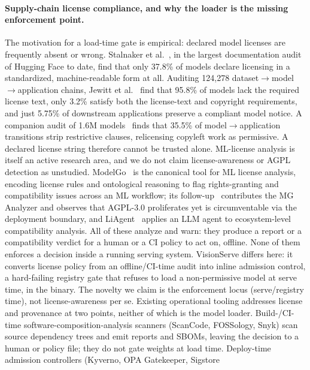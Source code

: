 \paragraph{Supply-chain license compliance, and why the loader is the missing enforcement point.}
The motivation for a load-time gate is empirical: declared model licenses are
frequently absent or wrong. Stalnaker et al.~\cite{stalnaker2025huggingface}, in the
largest documentation audit of Hugging Face to date, find that only 37.8\% of models
declare licensing in a standardized, machine-readable form at all.
Auditing 124{,}278 dataset$\to$model$\to$application
chains, Jewitt et al.~\cite{jewitt2026permissivewashing} find that 95.8\% of
models lack the required license text, only 3.2\% satisfy both the license-text
and copyright requirements, and just 5.75\% of downstream applications preserve a
compliant model notice. A companion audit of 1.6M
models~\cite{jewitt2025licensedrift} finds that 35.5\% of
model$\to$application transitions strip restrictive clauses, relicensing copyleft
work as permissive. A declared license string therefore cannot be trusted alone.
ML-license analysis is itself an active research area, and we do not claim
license-awareness or AGPL detection as unstudied. ModelGo~\cite{duan2024modelgo} is
the canonical tool for ML license analysis, encoding license rules and ontological
reasoning to flag rights-granting and compatibility issues across an ML workflow; its
follow-up~\cite{duan2026stolengpl} contributes the MG Analyzer and observes that
AGPL-3.0 proliferates yet is circumventable via the deployment boundary, and
LiAgent~\cite{wang2026liagent} applies an LLM agent to ecosystem-level compatibility
analysis. All of these analyze and warn: they produce a report or a
compatibility verdict for a human or a CI policy to act on, offline. None of them
enforces a decision inside a running serving system. VisionServe differs here:
it converts license policy from an offline/CI-time
audit into inline admission control, a hard-failing registry gate that
refuses to load a non-permissive model at serve time, in the binary. The novelty we claim
is the enforcement locus (serve/registry time), not license-awareness per se.
Existing operational tooling addresses license and provenance at two points, neither of
which is the model loader. Build-/CI-time software-composition-analysis scanners
(ScanCode, FOSSology, Snyk) scan source dependency trees and emit reports and
SBOMs, leaving the decision to a human or policy file; they do not gate weights at
load time. Deploy-time admission controllers (Kyverno, OPA Gatekeeper, Sigstore
